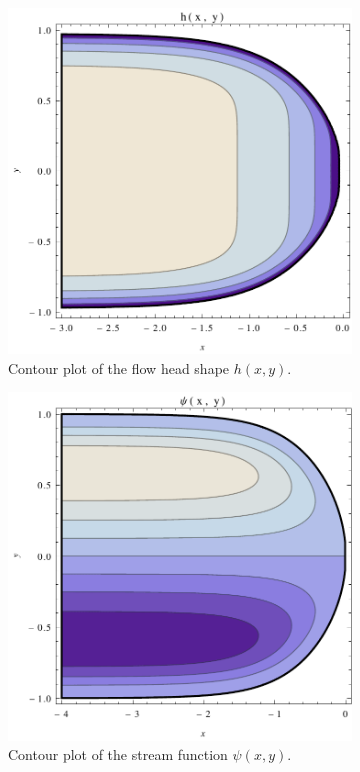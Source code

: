 \begin{figure}[htp]
\centering
\begin{subfigure}{.5\textwidth}
  \centering
  \includegraphics[width=.92\linewidth]{vector/h_contour}
  \caption{Contour plot of the flow head shape $h(x,y)$.}
  \label{fig:h}
\end{subfigure}%
\begin{subfigure}{.5\textwidth}
  \centering
  \includegraphics[width=.92\linewidth]{vector/psi_contour}
  \caption{Contour plot of the stream function $\psi(x,y)$.}
  \label{fig:psi}
\end{subfigure}
\caption{}
\label{fig:test2}
\end{figure}


